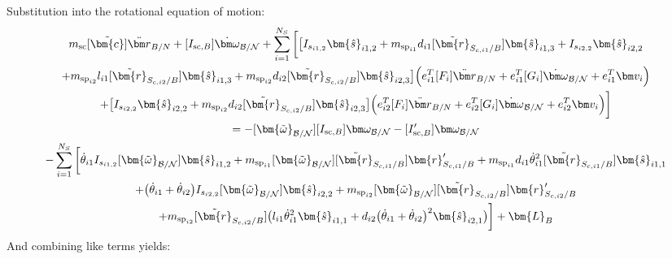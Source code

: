 Substitution into the rotational equation of motion:
\begin{multline}
	m_{\text{sc}} [\tilde{\bm{c}}] \ddot{\bm r}_{B/N} + [I_{\text{sc},B}] \dot{\bm\omega}_{\cal B/N} + \sum\limits_{i=1}^{N_S} \bigg[  \big[I_{s_{i1,2}}\bm{\hat{s}}_{i1,2}+m_{\text{sp}_{i1}}d_{i1} [\tilde{\bm{r}}_{S_{c,i1}/B}]   \bm{\hat{s}}_{i1,3} + I_{s_{i2,2}}\bm{\hat{s}}_{i2,2}\\
	+m_{\text{sp}_{i2}}l_{i1} [\tilde{\bm{r}}_{S_{c,i2}/B}]  \bm{\hat{s}}_{i1,3}+m_{\text{sp}_{i2}}d_{i2} [\tilde{\bm{r}}_{S_{c,i2}/B}] \bm{\hat{s}}_{i2,3}\big] \Big(e_{i1}^T[F_i] \ddot{\bm r}_{B/N} + e_{i1}^T[G_i]\dot{\bm\omega}_{\cal B/N} + e_{i1}^T\bm v_i\Big)\\
	+\big[ I_{s_{i2,2}}\bm{\hat{s}}_{i2,2}+m_{\text{sp}_{i2}} d_{i2} [\tilde{\bm{r}}_{S_{c,i2}/B}] \bm{\hat{s}}_{i2,3}\big]\Big(e_{i2}^T[F_i] \ddot{\bm r}_{B/N} + e_{i2}^T[G_i]\dot{\bm\omega}_{\cal B/N} + e_{i2}^T\bm v_i\Big)
	\bigg] \\
	= -[\bm{\tilde{\omega}}_{\cal B/N}] [I_{\text{sc},B}] \bm\omega_{\cal B/N} - [I'_{\text{sc},B}] \bm\omega_{\cal B/N} \\
	-  \sum\limits_{i=1}^{N_S} \bigg[
	\dot{\theta}_{i1} I_{s_{i1,2}} [\bm{\tilde{\omega}}_{\cal B/N}] \bm{\hat{s}}_{i1,2}
	+m_{\text{sp}_{i1}} [\bm{\tilde{\omega}}_{\cal B/N}] [\tilde{\bm{r}}_{S_{c,i1}/B}] \bm{r}'_{S_{c,i1}/B} +m_{\text{sp}_{i1}}d_{i1}\dot{\theta}_{i1}^2  [\tilde{\bm{r}}_{S_{c,i1}/B}] \bm{\hat{s}}_{i1,1}\\
	+ \big(\dot{\theta}_{i1}+\dot{\theta}_{i2}\big) I_{s_{i2,2}}[\bm{\tilde{\omega}}_{\cal B/N}]\bm{\hat{s}}_{i2,2}
	+m_{\text{sp}_{i2}} [\bm{\tilde{\omega}}_{\cal B/N}] [\tilde{\bm{r}}_{S_{c,i2}/B}] \bm{r}'_{S_{c,i2}/B} 	\\+m_{\text{sp}_{i2}} [\tilde{\bm{r}}_{S_{c,i2}/B}] \big(l_{i1} \dot{\theta}_{i1}^2 \bm{\hat{s}}_{i1,1} + d_{i2}\big(\dot{\theta}_{i1} + \dot{\theta}_{i2}\big)^2\bm{\hat{s}}_{i2,1}\big)\bigg]
	+ \bm{L}_B
	\label{eq:Final7sub}
\end{multline}
And combining like terms yields:
